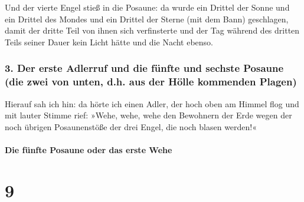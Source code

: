  Und der vierte Engel stieß in die Posaune: da wurde ein
Drittel der Sonne und ein Drittel des Mondes und ein Drittel der Sterne
(mit dem Bann) geschlagen, damit der dritte Teil von ihnen sich
verfinsterte und der Tag während des dritten Teils seiner Dauer kein
Licht hätte und die Nacht ebenso.

\hypertarget{der-erste-adlerruf-und-die-fuxfcnfte-und-sechste-posaune-die-zwei-von-unten-d.h.-aus-der-huxf6lle-kommenden-plagen}{%
\subsubsection{3. Der erste Adlerruf und die fünfte und sechste Posaune
(die zwei von unten, d.h. aus der Hölle kommenden
Plagen)}\label{der-erste-adlerruf-und-die-fuxfcnfte-und-sechste-posaune-die-zwei-von-unten-d.h.-aus-der-huxf6lle-kommenden-plagen}}

 Hierauf sah ich hin: da hörte ich einen Adler, der hoch
oben am Himmel flog und mit lauter Stimme rief: »Wehe, wehe, wehe den
Bewohnern der Erde wegen der noch übrigen Posaunenstöße der drei Engel,
die noch blasen werden!«

\hypertarget{die-fuxfcnfte-posaune-oder-das-erste-wehe}{%
\paragraph{Die fünfte Posaune oder das erste
Wehe}\label{die-fuxfcnfte-posaune-oder-das-erste-wehe}}

\hypertarget{section-8}{%
\section{9}\label{section-8}}

